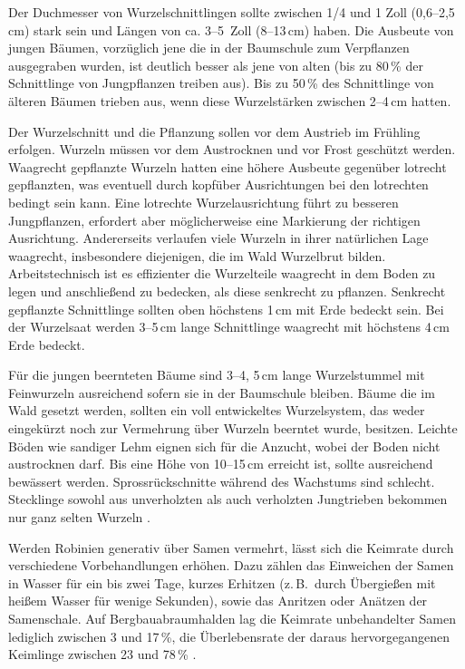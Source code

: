 \documentclass[twocolumn]{scrartcl}
\begin{document}
Der Duchmesser von Wurzelschnittlingen sollte zwischen 1/4 und 1 Zoll
(0,6--2,5\,cm) stark sein und Längen von ca. 3--5~Zoll (8--13\,cm)
haben. Die Ausbeute von jungen Bäumen, vorzüglich jene die in der
Baumschule zum Verpflanzen ausgegraben wurden, ist deutlich besser als
jene von alten (bis zu 80\,\% der Schnittlinge von Jungpflanzen
treiben aus). Bis zu 50\,\% des Schnittlinge von älteren Bäumen
trieben aus, wenn diese Wurzelstärken zwischen 2--4\,cm hatten.

Der Wurzelschnitt und die Pflanzung sollen vor dem Austrieb im Frühling
erfolgen. Wurzeln müssen vor dem Austrocknen und vor Frost geschützt
werden. Waagrecht gepflanzte Wurzeln hatten eine höhere Ausbeute
gegenüber lotrecht gepflanzten, was eventuell durch kopfüber
Ausrichtungen bei den lotrechten bedingt sein kann. Eine lotrechte
Wurzelausrichtung führt zu besseren Jungpflanzen, erfordert aber
möglicherweise eine Markierung der richtigen Ausrichtung. Andererseits
verlaufen viele Wurzeln in ihrer natürlichen Lage waagrecht,
insbesondere diejenigen, die im Wald Wurzelbrut
bilden. Arbeitstechnisch ist es effizienter die Wurzelteile waagrecht
in dem Boden zu legen und anschließend zu bedecken, als diese
senkrecht zu pflanzen. Senkrecht gepflanzte Schnittlinge sollten oben
höchstens 1\,cm mit Erde bedeckt sein. Bei der Wurzelsaat werden
3--5\,cm lange Schnittlinge waagrecht mit höchstens 4\,cm Erde
bedeckt.

Für die jungen beernteten Bäume sind 3--4, 5\,cm lange Wurzelstummel
mit Feinwurzeln ausreichend sofern sie in der Baumschule
bleiben. Bäume die im Wald gesetzt werden, sollten ein voll
entwickeltes Wurzelsystem, das weder eingekürzt noch zur Vermehrung
über Wurzeln beerntet wurde, besitzen.  Leichte Böden wie sandiger
Lehm eignen sich für die Anzucht, wobei der Boden nicht austrocknen
darf.  Bis eine Höhe von 10--15\,cm erreicht ist, sollte ausreichend
bewässert werden.  Sprossrückschnitte während des Wachstums sind
schlecht. Stecklinge sowohl aus unverholzten als auch verholzten
Jungtrieben bekommen nur ganz selten Wurzeln
\citep{swingle1937robinie,redei2001robinieVermehrung,redei2005robinieVermehrung}.

Werden Robinien generativ über Samen vermehrt, lässt sich die Keimrate
durch verschiedene Vorbehandlungen erhöhen. Dazu zählen das Einweichen
der Samen in Wasser für ein bis zwei Tage, kurzes Erhitzen
(z.\,B.\ durch Übergießen mit heißem Wasser für wenige Sekunden),
sowie das Anritzen oder Anätzen der Samenschale. Auf
Bergbauabraumhalden lag die Keimrate unbehandelter Samen lediglich
zwischen 3 und 17\,\%, die Überlebensrate der daraus hervorgegangenen
Keimlinge zwischen 23 und 78\,\% \citep{limstrom1949robinie}.
\end{document}

